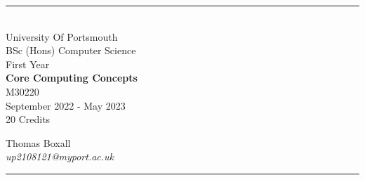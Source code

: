 \documentclass[a4paper, 11pt]{report}
\begin{document}
\begin{titlepage}
    \rule{\textwidth}{1px}
    \vspace{0.025\textheight}\\
    \huge{University Of Portsmouth}\\
    \huge{BSc (Hons) Computer Science}\\
    \huge{First Year}\\
    \vfill
    \LARGE{\textbf{Core Computing Concepts}}\\
    \Large{M30220}\\
    \large{September 2022 - May 2023}\\
    \large{20 Credits}
    \vfill

    
    \begin{FlushRight}
        \large{Thomas Boxall}\\
        \textit{up2108121@myport.ac.uk}\\
        
    \end{FlushRight}
    \vspace{0.2\textheight}
    \rule{\textwidth}{1px}
    
\end{titlepage}

\tableofcontents

\end{document}
